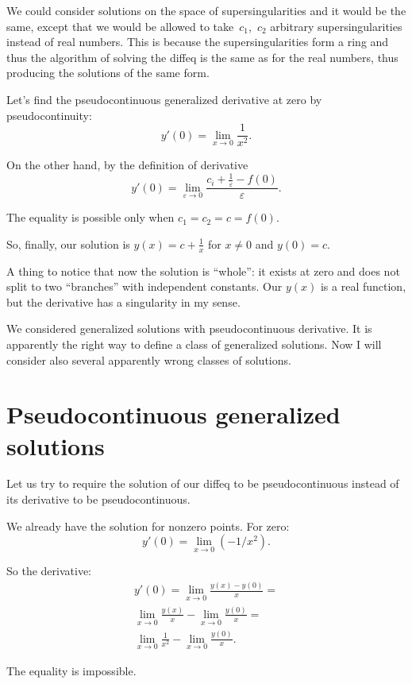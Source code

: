 \begin{rem}
We could consider solutions on the space of supersingularities and it would be the same, except that we would be allowed to take~$c_1$,~$c_2$ arbitrary supersingularities instead of real numbers. This is because the supersingularities form a ring and thus the algorithm of solving the diffeq is the same as for the real numbers, thus producing the solutions of the same form.
\end{rem}

Let's find the pseudocontinuous generalized derivative at zero by pseudocontinuity:
\[ y'(0) = \lim_{x\to 0} \frac{1}{x^2}. \]

On the other hand, by the definition of derivative
\[ y'(0) = \lim_{\varepsilon \rightarrow 0}  \frac{c_i + \frac{1}{\varepsilon} - f
(0)}{\varepsilon}. \]

The equality is possible only when $c_1=c_2=c=f(0)$.

So, finally, our solution is $y(x) = c + \frac{1}{x}$ for $x\ne 0$ and $y(0)=c$.

A thing to notice that now the solution is ``whole'': it exists at zero and does not split to two ``branches'' with independent constants. Our $y(x)$ is a real function, but the derivative has a singularity in my sense.

We considered generalized solutions with pseudocontinuous derivative. It is apparently the right way to define a class of generalized solutions. Now I will consider also several apparently wrong classes of solutions.

\section{Pseudocontinuous generalized solutions}

Let us try to require the solution of our diffeq to be pseudocontinuous instead of its derivative to be pseudocontinuous.

We already have the solution for nonzero points. For zero:
\[ y'(0) = \lim_{x\to 0}(-1/x^2). \]

So the derivative:
\begin{multline*}
y' (0) = \lim_{x\to 0} \frac{y(x) - y(0)}{x} =\\ \lim_{x\to 0} \frac{y(x)}{x} - \lim_{x\to 0} \frac{y(0)}{x} =\\ \lim_{x\to 0} \frac{1}{x^2} - \lim_{x\to 0} \frac{y(0)}{x}.
\end{multline*}

The equality is impossible.
